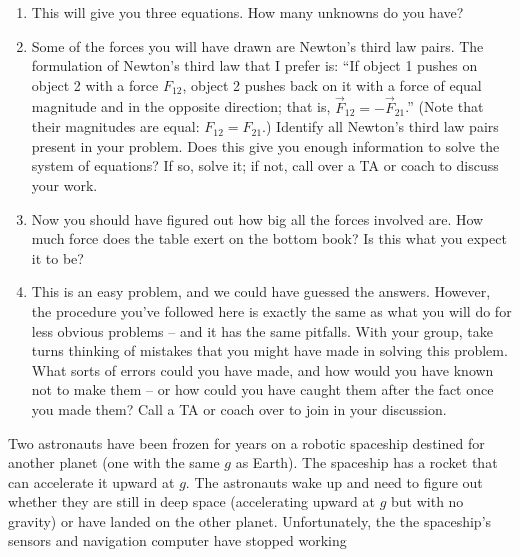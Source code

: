 \documentclass[12pt]{article}
\newcommand{\vsi}{\vspace{1in}}
\begin{document}
\begin{enumerate}
\vsi\vsi

\item This will give you three equations. How many unknowns do you have? 

\vsi

\item Some of the forces you will have drawn are Newton's third law pairs. The formulation of Newton's third law that I prefer is: ``If object 1 pushes on object 2 with a force $F_{12}$, object 2 pushes back on it with a force of 
equal magnitude and in the opposite direction; that is, $\vec F_{12} = - \vec F_{21}$.'' (Note that their magnitudes are equal: $F_{12}=F_{21}$.)  
Identify all Newton's third law pairs present in your problem. Does this give you enough information to solve the system of equations? If so, solve it; if not, call over a TA or coach to discuss your work.

\vsi\vsi\vsi\vsi

\item Now you should have figured out how big all the forces involved are. How much force does the table exert on the bottom book? Is this what you expect it to be?

\vsi
\newpage

\item This is an easy problem, and we could have guessed the answers. However, the procedure you've followed here is exactly the same as what you will do for less obvious problems -- and it has the same pitfalls. With your 
group, take turns thinking of mistakes that you might have made in solving this problem. What sorts of errors could you have made, and how would you have known not to make them -- or how could you have caught them after the
fact once you made them? Call a TA or coach over to join in your discussion.

\end{enumerate}

\newpage

\small

Two astronauts have been frozen for years on a robotic spaceship destined for another planet (one with the same $g$ as Earth). The spaceship has a rocket that can accelerate it upward at $g$. The astronauts wake up and need to figure out whether they are still in deep space (accelerating upward at $g$ but with no gravity) or have landed on the other planet. Unfortunately, the the spaceship's sensors and navigation computer have stopped working%
\end{document}
